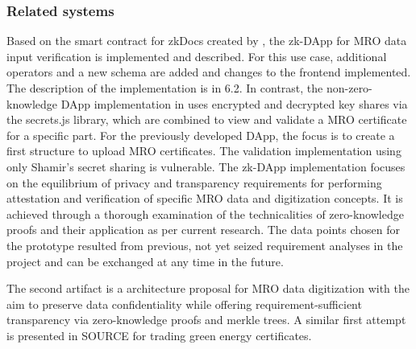 \subsubsection{Related systems}
Based on the smart contract for zkDocs created by \citep{zkdocs}, the zk-DApp for MRO data input verification is implemented and described. For this use case, additional operators and a new schema are added and changes to the frontend implemented. The description of the implementation is in 6.2. In contrast, the non-zero-knowledge DApp implementation in \citet{semesterproject} uses encrypted and decrypted key shares via the secrets.js library, which are combined to view and validate a MRO certificate for a specific part. For the previously developed DApp, the focus is to create a first structure to upload MRO certificates. The validation implementation using only Shamir's secret sharing is vulnerable. The zk-DApp implementation focuses on the equilibrium of privacy and transparency requirements for performing attestation and verification of specific MRO data and digitization concepts. It is achieved through a thorough examination of the technicalities of zero-knowledge proofs and their application as per current research. The data points chosen for the prototype resulted from previous, not yet seized requirement analyses in the project and can be exchanged at any time in the future. 

The second artifact is a architecture proposal for MRO data digitization with the aim to preserve data confidentiality while offering requirement-sufficient transparency via zero-knowledge proofs and merkle trees. A similar first attempt is presented in SOURCE for trading green energy certificates. 
